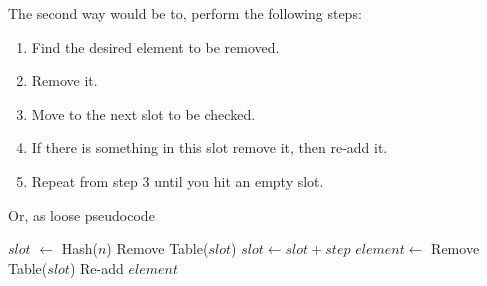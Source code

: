 \documentclass[12pt]{article}
\begin{document}
The second way would be to, perform the following steps:
\begin{enumerate}
	\item Find the desired element to be removed.
	\item Remove it.
	\item Move to the next slot to be checked.
	\item If there is something in this slot remove it, then re-add it.
	\item Repeat from step 3 until you hit an empty slot.
\end{enumerate} 
Or, as loose pseudocode
\begin{algorithm}
\begin{algorithmic}[1]
		\State $slot$ $\gets$ Hash($n$)
		\State Remove Table($slot$)
		\Repeat
			\State $slot \gets slot+step$
				\State $element \gets$ Remove Table($slot$)
				\State Re-add $element$
			\EndIf
	\EndFunction
\end{algorithmic}
\end{algorithm}
\end{document}

